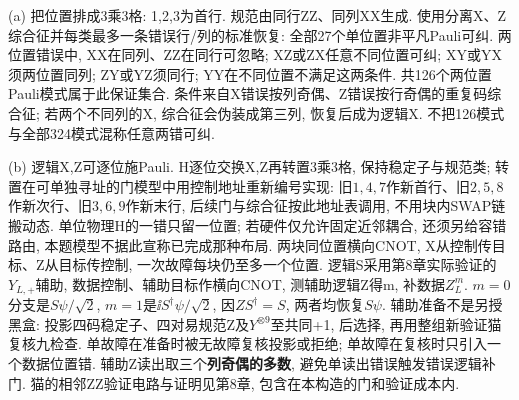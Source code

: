\begin{solution}(a) 把位置排成3乘3格: 1,2,3为首行. 规范由同行ZZ、同列XX生成. 使用分离X、Z综合征并每类最多一条错误行/列的标准恢复: 全部27个单位置非平凡Pauli可纠. 两位置错误中, XX在同列、ZZ在同行可忽略; XZ或ZX任意不同位置可纠; XY或YX须两位置同列; ZY或YZ须同行; YY在不同位置不满足这两条件. 共126个两位置Pauli模式属于此保证集合. 条件来自X错误按列奇偶、Z错误按行奇偶的重复码综合征; 若两个不同列的X, 综合征会伪装成第三列, 恢复后成为逻辑X. 不把126模式与全部324模式混称任意两错可纠.

(b) 逻辑X,Z可逐位施Pauli. H逐位交换X,Z再转置3乘3格, 保持稳定子与规范类; 转置在可单独寻址的门模型中用控制地址重新编号实现: 旧$1,4,7$作新首行、旧$2,5,8$作新次行、旧$3,6,9$作新末行, 后续门与综合征按此地址表调用, 不用块内SWAP链搬动态. 单位物理H的一错只留一位置; 若硬件仅允许固定近邻耦合, 还须另给容错路由, 本题模型不据此宣称已完成那种布局. 两块同位置横向CNOT, X从控制传目标、Z从目标传控制, 一次故障每块仍至多一个位置.
逻辑S采用第8章实际验证的$Y_{L,+}$辅助, 数据控制、辅助目标作横向CNOT, 测辅助逻辑Z得m, 补数据$Z_L^m$. $m=0$分支是$S\psi/\sqrt2$, $m=1$是$\ii S^\dagger\psi/\sqrt2$, 因$ZS^\dagger=S$, 两者均恢复$S\psi$. 辅助准备不是另授黑盒: 投影四码稳定子、四对易规范Z及$Y^{\otimes9}$至共同+1, 后选择, 再用整组新验证猫复核九检查. 单故障在准备时被无故障复核投影或拒绝; 单故障在复核时只引入一个数据位置错. 辅助Z读出取三个\textbf{列奇偶的多数}, 避免单读出错误触发错误逻辑补门. 猫的相邻ZZ验证电路与证明见第8章, 包含在本构造的门和验证成本内.


\end{solution}
